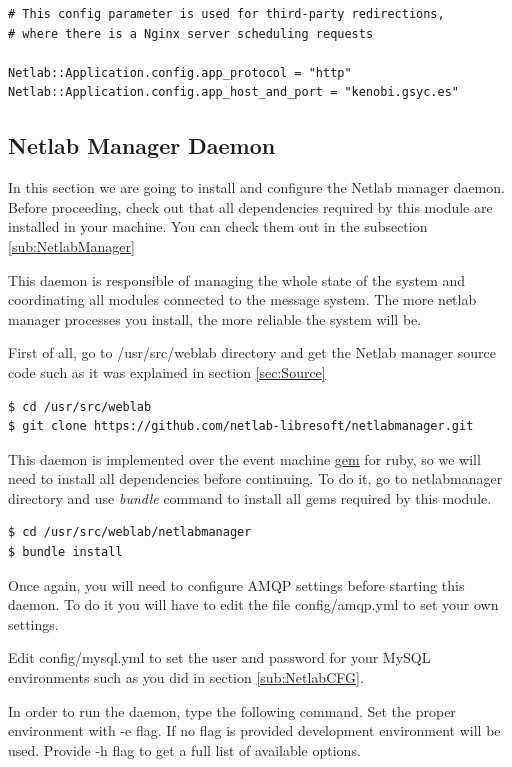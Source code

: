 \documentclass{article}
\begin{document}
\begin{verbatim}
# This config parameter is used for third-party redirections, 
# where there is a Nginx server scheduling requests

Netlab::Application.config.app_protocol = "http"
Netlab::Application.config.app_host_and_port = "kenobi.gsyc.es"
\end{verbatim}

\subsection{Netlab Manager Daemon}
In this section we are going to install and configure the Netlab manager daemon. Before proceeding, check out that all dependencies required by this module are installed in your machine. You can check them out in the subsection \ref{sub:NetlabManager}

This daemon is responsible of managing the whole state of the system and coordinating all modules connected to the message system. The more netlab manager processes you install, the more reliable the system will be.

First of all, go to /usr/src/weblab directory and get the Netlab manager source code such as it was explained in section \ref{sec:Source}

\begin{verbatim}
$ cd /usr/src/weblab
$ git clone https://github.com/netlab-libresoft/netlabmanager.git
\end{verbatim}

This daemon is implemented over the event machine \href{http://rubyeventmachine.com/}{gem} for ruby, so we will need to install all dependencies before continuing. To do it, go to netlabmanager directory and use \textit{bundle} command to install all gems required by this module.

\begin{verbatim}
$ cd /usr/src/weblab/netlabmanager
$ bundle install
\end{verbatim}

Once again, you will need to configure AMQP settings before starting this daemon. To do it you will have to edit the file config/amqp.yml to set your own settings.

Edit config/mysql.yml to set the user and password for your MySQL environments such as you did in section \ref{sub:NetlabCFG}.

In order to run the daemon, type the following command. Set the proper environment with -e flag. If no flag is provided development environment will be used. Provide -h flag to get a full list of available options.
\end{document}
